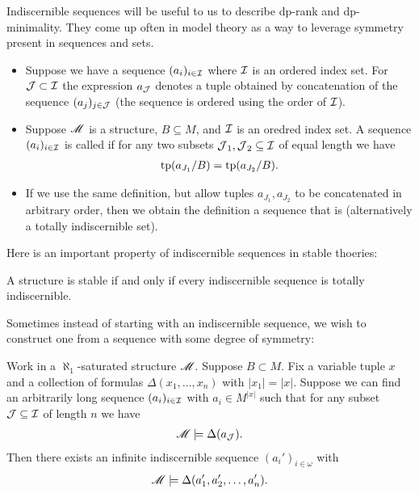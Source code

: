 Indiscernible sequences will be useful to us to describe dp-rank and dp-minimality.
They come up often in model theory as a way to leverage symmetry present in sequences and sets.
\begin{Definition}
  \begin{itemize}
  \item Suppose we have a sequence $(a_i)_{i \in \operatorname{\mathcal I}}$ where $\operatorname{\mathcal I}$ is an ordered index set.
    For $\operatorname{\mathcal J} \subset \operatorname{\mathcal I}$ the expression $a_{\operatorname{\mathcal J}}$ denotes  a tuple obtained by concatenation of the sequence $(a_j)_{j \in \operatorname{\mathcal J}}$
    (the sequence is ordered using the order of $\operatorname{\mathcal I}$).    
  \item Suppose $\mathscr M$ is a structure, $B \subseteq M$, and $\operatorname{\mathcal I}$ is an oredred index set. 
    A sequence $(a_i)_{i \in \operatorname{\mathcal I}}$ is called  if
    for any two subsets $\operatorname{\mathcal J}_1, \operatorname{\mathcal J}_2 \subseteq \operatorname{\mathcal I}$ of equal length we have 
    \begin{align*}
      \operatorname{tp}(a_{J_1}/B) = \operatorname{tp}(a_{J_2}/B).
    \end{align*}
  \item If we use the same definition, but allow tuples $a_{J_1}, a_{J_2}$ to be concatenated in arbitrary order,
    then we obtain the definition a sequence that is  (alternatively a totally indiscernible set).
  \end{itemize}
\end{Definition}

Here is an important property of indiscernible sequences in stable thoeries:
\begin{Lemma}
  A structure is stable if and only if every indiscernible sequence is totally indiscernible.
\end{Lemma}

Sometimes instead of starting with an indiscernible sequence, we wish to construct one from a sequence with some degree of symmetry:
\begin{Lemma} 
  Work in a $\aleph_1$-saturated structure $\mathscr M$.
  Suppose $B \subset M$.
  Fix a variable tuple $x$ and a collection of formulas $\Delta(x_1, \ldots, x_n)$ with $|x_1| = |x|$.
  Suppose we can find an arbitrarily long sequence $(a_i)_{i \in \operatorname{\mathcal I}}$ with $a_i \in M^{|x|}$ such that
  for any subset $\operatorname{\mathcal J} \subseteq \operatorname{\mathcal I}$ of length $n$ we have
  \begin{align*}
    \mathscr M \models \Delta(a_{\operatorname{\mathcal J}}).
  \end{align*}
  Then there exists an infinite indiscernible sequence $(a_i')_{i \in \omega}$ with
  \begin{align*}
    \mathscr M \models \Delta(a_1', a_2', \ldots, a_n').
  \end{align*}
\end{Lemma}

